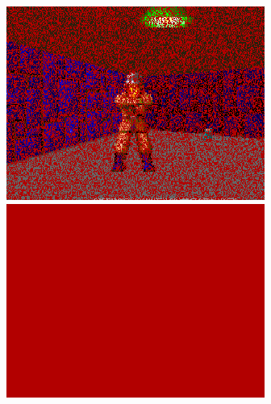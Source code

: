 \begin{minipage}{\textwidth}
\centering
  \includegraphics[width=.9\textwidth]{imgs/fizzlefade/dying/screenshot_52.png} \\
  \vspace*{0.5cm}
  \includegraphics[width=.9\textwidth]{imgs/fizzlefade/dying/screenshot_86.png} \\
\end{minipage}


